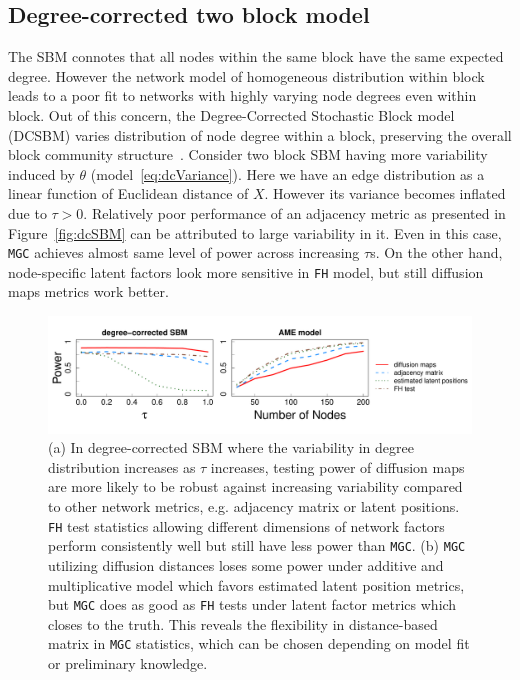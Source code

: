 \documentclass[12pt]{article}
\theoremstyle{definition}
\begin{document}
\subsection{Degree-corrected two block model}

The SBM connotes that all nodes within the same block have the same expected degree. However the network model of homogeneous distribution within block leads to a poor fit to networks with highly varying node degrees even within block. Out of this concern, the Degree-Corrected Stochastic Block model (DCSBM) varies distribution of node degree within a block, preserving the overall block community structure~\citep{karrer2011stochastic}. Consider two block SBM having more variability induced by $\theta$ (model~\ref{eq:dcVariance}). Here we have an edge distribution as a linear function of Euclidean distance of $X$. However its variance becomes inflated due to $\tau > 0$. Relatively poor performance of an adjacency metric as presented in Figure~\ref{fig:dcSBM} can be attributed to large variability in it. Even in this case, \texttt{MGC} achieves almost same level of power across increasing $\tau$s. On the other hand, node-specific latent factors look more sensitive in \texttt{FH} model, but still diffusion maps metrics work better.


\begin{figure}[H]
	\centering
		\includegraphics[width=\textwidth]{../Figure/amedc.pdf}
	\caption{(a) In degree-corrected SBM where the variability in degree distribution increases as $\tau$ increases, testing power of diffusion maps are more likely to be robust against increasing variability compared to other network metrics, e.g. adjacency matrix or latent positions. \texttt{FH} test statistics allowing different dimensions of network factors perform consistently well but still have less power than \texttt{MGC}. (b) \texttt{MGC} utilizing diffusion distances loses some power under additive and multiplicative model which favors estimated latent position metrics, but \texttt{MGC} does as good as \texttt{FH} tests under latent factor metrics which closes to the truth. This reveals the flexibility in distance-based matrix in \texttt{MGC} statistics, which can be chosen depending on model fit or preliminary knowledge.}
	\label{fig:combined}
\end{figure}	
	
\end{document}
